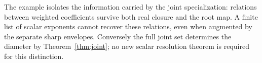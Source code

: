 The example isolates the information carried by the joint specialization:
relations between weighted coefficients survive both real closure and the
root map. A finite list of scalar exponents cannot recover these relations,
even when augmented by the separate sharp envelopes. Conversely the full
joint set determines the diameter by Theorem~\ref{thm:joint}; no new scalar
resolution theorem is required for this distinction.
